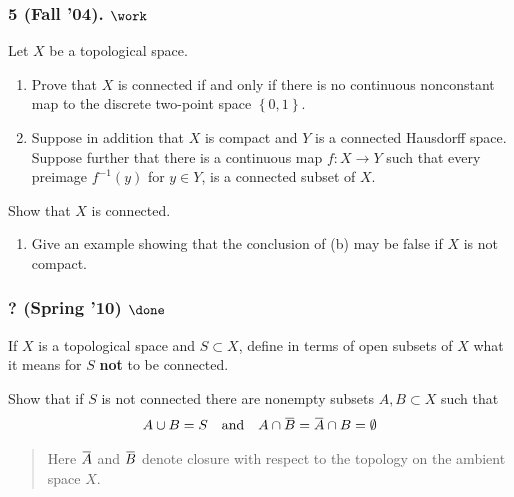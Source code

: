 \hypertarget{fall-04.-work}{%
\subsubsection{\texorpdfstring{5 (Fall '04).
\(\work\)}{5 (Fall '04). \textbackslash work}}\label{fall-04.-work}}

\begin{problem}[?]

Let \(X\) be a topological space.

\begin{enumerate}
\def\labelenumi{\alph{enumi}.}
\item
  Prove that \(X\) is connected if and only if there is no continuous
  nonconstant map to the discrete two-point space
  \(\left\{{0, 1}\right\}\).
\item
  Suppose in addition that \(X\) is compact and \(Y\) is a connected
  Hausdorff space. Suppose further that there is a continuous map
  \(f : X \to Y\) such that every preimage \(f^{-1}(y)\) for
  \(y \in Y\), is a connected subset of \(X\).
\end{enumerate}

Show that \(X\) is connected.

\begin{enumerate}
\def\labelenumi{\alph{enumi}.}
\setcounter{enumi}{2}
\tightlist
\item
  Give an example showing that the conclusion of (b) may be false if
  \(X\) is not compact.
\end{enumerate}

\end{problem}

\hypertarget{spring-10-done}{%
\subsubsection{\texorpdfstring{? (Spring '10)
\(\done\)}{? (Spring '10) \textbackslash done}}\label{spring-10-done}}

\begin{problem}[?]

If \(X\) is a topological space and \(S \subset X\), define in terms of
open subsets of \(X\) what it means for \(S\) \textbf{not} to be
connected.

Show that if \(S\) is not connected there are nonempty subsets
\(A, B \subset X\) such that
\begin{align*}
A \cup B = S {\quad \operatorname{and} \quad} A \cap \mkern 1.5mu\overline{\mkern-1.5muB\mkern-1.5mu}\mkern 1.5mu = \mkern 1.5mu\overline{\mkern-1.5muA\mkern-1.5mu}\mkern 1.5mu \cap B = \emptyset
\end{align*}

\begin{quote}
Here \(\mkern 1.5mu\overline{\mkern-1.5muA\mkern-1.5mu}\mkern 1.5mu\)
and \(\mkern 1.5mu\overline{\mkern-1.5muB\mkern-1.5mu}\mkern 1.5mu\)
denote closure with respect to the topology on the ambient space \(X\).
\end{quote}

\end{problem}

